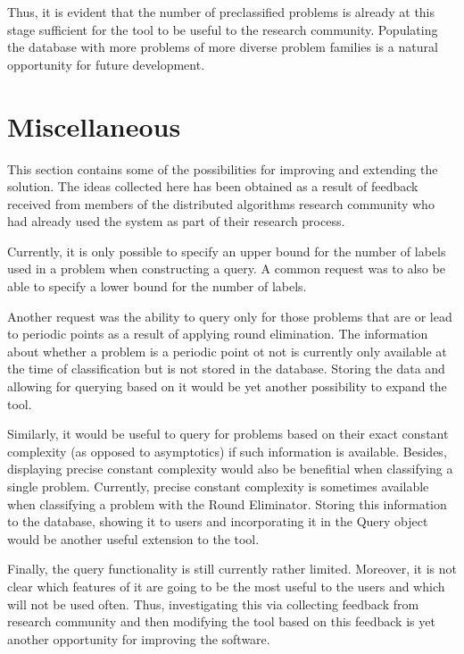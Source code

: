 Thus, it is evident that the number of preclassified problems is already at this stage sufficient
for the tool to be useful to the research community. Populating the database
with more problems of more diverse problem families is a natural opportunity for future
development.

\section{Miscellaneous}

This section contains some of the possibilities
for improving and extending the solution. The ideas collected
here has been obtained as a result of feedback
received from members of the distributed algorithms
research community who had already used the system
as part of their research process.

Currently, it is only possible to specify an upper bound for
the number of labels used in a problem when constructing a query.
A common request was to also be able to specify a lower bound for the
number of labels.

Another request was the ability to query only for those problems that are
or lead to periodic points as a result of applying round elimination.
The information about whether a problem is a periodic point ot not
is currently only available at the time of classification but is
not stored in the database. Storing the data and allowing for
querying based on it would be yet another possibility to expand the tool.

Similarly, it would be useful to query for problems based on their
exact constant complexity (as opposed to asymptotics) if such
information is available. Besides, displaying precise constant complexity
would also be benefitial when classifying a single problem.
Currently, precise constant complexity is sometimes available when
classifying a problem with the Round Eliminator. Storing this
information to the database, showing it to users and incorporating it
in the Query object would be another useful extension to the tool.

Finally, the query functionality is still currently rather limited.
Moreover, it is not clear which features of it are going to be the
most useful to the users and which will not be used often.
Thus, investigating this via collecting feedback from
research community and then modifying the tool based on
this feedback is yet another opportunity for improving the software.

